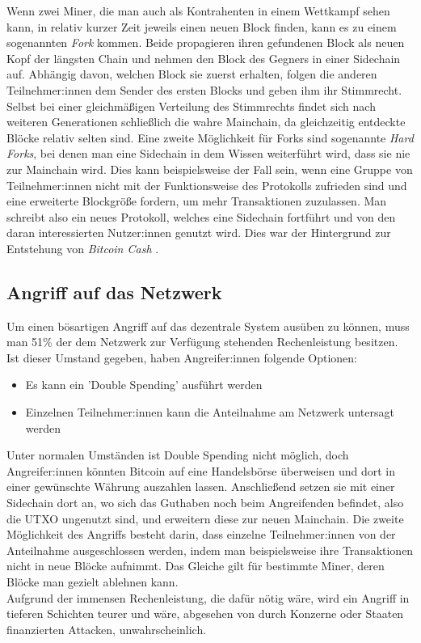Wenn zwei Miner, die man auch als Kontrahenten in einem Wettkampf sehen kann, in relativ kurzer Zeit jeweils einen neuen Block finden, kann es zu einem sogenannten \emph{Fork} kommen. 
Beide propagieren ihren gefundenen Block als neuen Kopf der längsten Chain und nehmen den Block des Gegners in einer Sidechain auf. Abhängig davon, welchen Block sie zuerst erhalten, folgen die anderen Teilnehmer:innen dem Sender des ersten Blocks und geben ihm ihr Stimmrecht. 
Selbst bei einer gleichmäßigen Verteilung des Stimmrechts findet sich nach weiteren Generationen schließlich die wahre Mainchain, da gleichzeitig entdeckte Blöcke relativ selten sind.
Eine zweite Möglichkeit für Forks sind sogenannte \emph{Hard Forks}, bei denen man eine Sidechain in dem Wissen weiterführt wird, dass sie nie zur Mainchain wird. Dies kann beispielsweise der Fall sein, wenn eine Gruppe von Teilnehmer:innen nicht mit der Funktionsweise des Protokolls zufrieden sind und eine erweiterte Blockgröße fordern, um mehr Transaktionen zuzulassen. Man schreibt also ein neues Protokoll, welches eine Sidechain fortführt und von den daran interessierten Nutzer:innen genutzt wird. Dies war der Hintergrund zur Entstehung von \emph{Bitcoin Cash} \cite[]{bitcoin_cash_2021}.
\subsection{Angriff auf das Netzwerk}
Um einen bösartigen Angriff auf das dezentrale System ausüben zu können, muss man 51\% der dem Netzwerk zur Verfügung stehenden Rechenleistung besitzen. Ist dieser Umstand gegeben, haben Angreifer:innen folgende Optionen:
\begin{itemize}
	\item Es kann ein 'Double Spending' ausführt werden
	\item Einzelnen Teilnehmer:innen kann die Anteilnahme am Netzwerk untersagt werden
\end{itemize}
Unter normalen Umständen ist Double Spending nicht möglich, doch Angreifer:innen könnten Bitcoin auf eine Handelsbörse überweisen und dort in einer gewünschte Währung auszahlen lassen. Anschließend setzen sie mit einer Sidechain dort an, wo sich das Guthaben noch beim Angreifenden befindet, also die UTXO ungenutzt sind, und erweitern diese zur neuen Mainchain.
Die zweite Möglichkeit des Angriffs besteht darin, dass einzelne Teilnehmer:innen von der Anteilnahme ausgeschlossen werden, indem man beispielsweise ihre Transaktionen nicht in neue Blöcke aufnimmt. Das Gleiche gilt für bestimmte Miner, deren Blöcke man gezielt ablehnen kann.\\

Aufgrund der immensen Rechenleistung, die dafür nötig wäre, wird ein Angriff in tieferen Schichten teurer und wäre, abgesehen von durch Konzerne oder Staaten finanzierten Attacken, unwahrscheinlich.